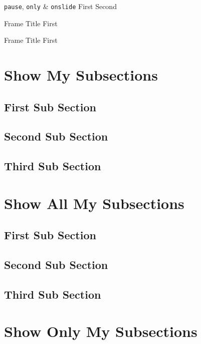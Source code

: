 \documentclass[169,8pt]{beamer}
\begin{document}
    \begin{frame}{\texttt{pause}, \texttt{only} \& \texttt{onslide}}
        First
        \pause
        Second
    \end{frame}

    \begin{frame}{Frame Title}
        First
    \end{frame}

    \begin{frame}{Frame Title}
        First
    \end{frame}
\section{Show My Subsections}
    \subsection{First Sub Section}
    \subsection{Second Sub Section}
    \subsection{Third Sub Section}

\section{Show All My Subsections}
    \subsection{First Sub Section}\subsectionFrame
    \subsection{Second Sub Section}\subsectionFrame
    \subsection{Third Sub Section}\subsectionFrame

\section{Show Only My Subsections}
\end{document}
